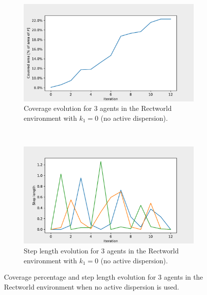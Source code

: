 \begin{figure}[H]
  \centering
  \begin{subfigure}[t]{0.5\textwidth}
    \centering
    \includegraphics[width=\textwidth]{figs/bigworld_3_agnt_k_1_0_k_2_1_area_traj.pdf}
    \caption{Coverage evolution for 3 agents in the Rectworld environment with $k_{1} = 0$ (no active dispersion).}
    \label{fig:3_agnt_bw_k_1_0_a_traj}
  \end{subfigure}%
  ~ 
  \begin{subfigure}[t]{0.5\textwidth}
    \centering
    \includegraphics[width=\textwidth]{figs/bigworld_3_agnt_k_1_0_k_2_1_step_traj.pdf}
    \caption{Step length evolution for 3 agents in the Rectworld environment with $k_{1} = 0$ (no active dispersion).}
    \label{fig:3_agnt_bw_k_1_0_s_traj}
  \end{subfigure}
  \caption{Coverage percentage and step length evolution for 3 agents in the Rectworld environment when no active dispersion is used.}
  \label{fig:3_agnt_bw_evolution}
\end{figure}



